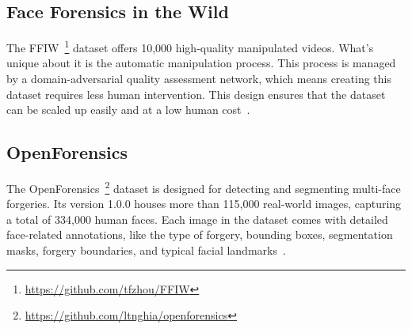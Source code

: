 \subsection{Face Forensics in the Wild}
The \ac{FFIW}~\footnote{\url{https://github.com/tfzhou/FFIW}} dataset offers 10,000 high-quality
manipulated videos. What's unique about it is the automatic manipulation process. This
process is managed by a domain-adversarial quality assessment network, which means creating
this dataset requires less human intervention. This design ensures that the dataset can
be scaled up easily and at a low human cost~\cite{Zhou_2021_CVPR}.

\subsection{OpenForensics}
The OpenForensics~\footnote{\url{https://github.com/ltnghia/openforensics}} dataset is 
designed for detecting and segmenting multi-face forgeries.
Its version 1.0.0 houses more than 115,000 real-world images, capturing a total of 334,000 human faces.
Each image in the dataset comes with detailed face-related annotations, like the type
of forgery, bounding boxes, segmentation masks, forgery boundaries, and typical facial
landmarks~\cite{ltnghia-ICCV2021}.


